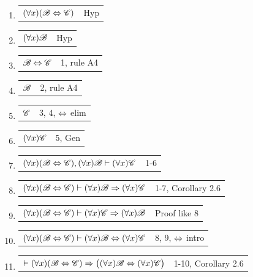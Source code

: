 \begin{enumerate}
    \item
        \begin{tabular}{p{8cm} r}
            $(\forall x) (\mathscr{B} \Leftrightarrow \mathscr{C})$ & Hyp
        \end{tabular}
    \item
        \begin{tabular}{p{8cm} r}
            $(\forall x) \mathscr{B}$ & Hyp
        \end{tabular}
    \item
        \begin{tabular}{p{8cm} r}
            $\mathscr{B} \Leftrightarrow \mathscr{C}$ & 1, rule A4
        \end{tabular}
    \item
        \begin{tabular}{p{8cm} r}
            $\mathscr{B}$ & 2, rule A4
        \end{tabular}
    \item
        \begin{tabular}{p{8cm} r}
            $\mathscr{C}$ & 3, 4, $\Leftrightarrow$ elim
        \end{tabular}
    \item
        \begin{tabular}{p{8cm} r}
            $(\forall x) \mathscr{C}$ & 5, Gen
        \end{tabular}
    \item
        \begin{tabular}{p{8cm} r}
            $(\forall x) (\mathscr{B} \Leftrightarrow \mathscr{C}), (\forall x) \mathscr{B} \vdash (\forall x) \mathscr{C}$ & 1-6
        \end{tabular}
    \item
        \begin{tabular}{p{8cm} r}
            $(\forall x) (\mathscr{B} \Leftrightarrow \mathscr{C}) \vdash (\forall x) \mathscr{B} \Rightarrow(\forall x) \mathscr{C}$ & 1-7, Corollary 2.6
        \end{tabular}
    \item
        \begin{tabular}{p{8cm} r}
            $(\forall x) (\mathscr{B} \Leftrightarrow \mathscr{C}) \vdash (\forall x) \mathscr{C} \Rightarrow(\forall x) \mathscr{B}$ & Proof like 8
        \end{tabular}
    \item
        \begin{tabular}{p{8cm} r}
            $(\forall x) (\mathscr{B} \Leftrightarrow \mathscr{C}) \vdash (\forall x) \mathscr{B} \Leftrightarrow (\forall x) \mathscr{C}$ & 8, 9, $\Leftrightarrow$ intro
        \end{tabular}
    \item
        \begin{tabular}{p{8cm} r}
            $\vdash (\forall x)(\mathscr{B} \Leftrightarrow \mathscr{C}) \Rightarrow \big((\forall x) \mathscr{B} \Leftrightarrow (\forall x) \mathscr{C} \big)$ & 1-10, Corollary 2.6
        \end{tabular}
\end{enumerate}

